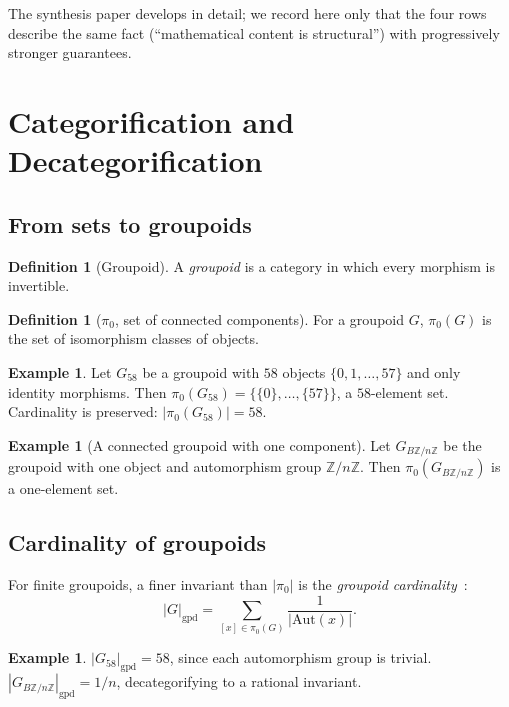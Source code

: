 \documentclass[12pt]{article}
\theoremstyle{definition}
\newtheorem{definition}[theorem]{Definition}
\newtheorem{example}[theorem]{Example}
\theoremstyle{remark}
\newcommand{\ZZ}{\mathbb{Z}}
\begin{document}
The synthesis paper develops  in detail; we record here only that the four rows describe the same fact (``mathematical content is structural'') with progressively stronger guarantees.

\section{Categorification and Decategorification}\label{sec:categorification}

\subsection{From sets to groupoids}

\begin{definition}[Groupoid]
A \emph{groupoid} is a category in which every morphism is invertible.
\end{definition}

\begin{definition}[$\pi_0$, set of connected components]
For a groupoid $G$, $\pi_0(G)$ is the set of isomorphism classes of objects.
\end{definition}

\begin{example}\label{ex:58-groupoid}
Let $G_{58}$ be a groupoid with $58$ objects $\{0, 1, \dots, 57\}$ and only identity morphisms. Then $\pi_0(G_{58}) = \{\{0\}, \dots, \{57\}\}$, a $58$-element set. Cardinality is preserved: $|\pi_0(G_{58})| = 58$.
\end{example}

\begin{example}[A connected groupoid with one component]
Let $G_{B\ZZ/n\ZZ}$ be the groupoid with one object and automorphism group $\ZZ/n\ZZ$. Then $\pi_0(G_{B\ZZ/n\ZZ})$ is a one-element set.
\end{example}

\subsection{Cardinality of groupoids}

For finite groupoids, a finer invariant than $|\pi_0|$ is the \emph{groupoid cardinality}~\cite{BaezDolan1998,Leinster2008}:
\[
  |G|_{\mathrm{gpd}} = \sum_{[x] \in \pi_0(G)} \frac{1}{|\mathrm{Aut}(x)|}.
\]

\begin{example}
$|G_{58}|_{\mathrm{gpd}} = 58$, since each automorphism group is trivial.
$|G_{B\ZZ/n\ZZ}|_{\mathrm{gpd}} = 1/n$, decategorifying to a rational invariant.
\end{example}
\end{document}
